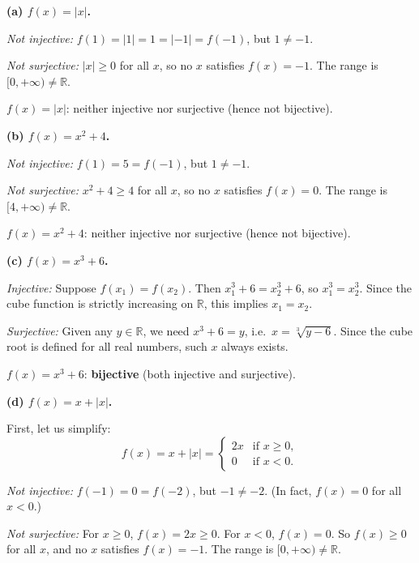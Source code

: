 \documentclass[12pt, a4paper]{article}
\newcommand{\R}{\mathbb{R}}
\begin{document}
\medskip

\textbf{(a)\; $f(x) = |x|$.}

\emph{Not injective:}\; $f(1) = |1| = 1 = |-1| = f(-1)$, but $1 \neq -1$.

\emph{Not surjective:}\; $|x| \ge 0$ for all $x$, so no $x$ satisfies $f(x) = -1$.
The range is $[0, +\infty) \neq \R$.

\begin{answerbox}
$f(x) = |x|$: neither injective nor surjective (hence not bijective).
\end{answerbox}

\bigskip
\textbf{(b)\; $f(x) = x^2 + 4$.}

\emph{Not injective:}\; $f(1) = 5 = f(-1)$, but $1 \neq -1$.

\emph{Not surjective:}\; $x^2 + 4 \ge 4$ for all $x$, so no $x$ satisfies $f(x) = 0$.
The range is $[4, +\infty) \neq \R$.

\begin{answerbox}
$f(x) = x^2 + 4$: neither injective nor surjective (hence not bijective).
\end{answerbox}

\bigskip
\textbf{(c)\; $f(x) = x^3 + 6$.}

\emph{Injective:}\; Suppose $f(x_1) = f(x_2)$. Then $x_1^3 + 6 = x_2^3 + 6$,
so $x_1^3 = x_2^3$. Since the cube function is strictly increasing on $\R$,
this implies $x_1 = x_2$.

\emph{Surjective:}\; Given any $y \in \R$, we need $x^3 + 6 = y$, i.e.\
$x = \sqrt[3]{y - 6}$. Since the cube root is defined for all real numbers,
such $x$ always exists.

\begin{answerbox}
$f(x) = x^3 + 6$: \textbf{bijective} (both injective and surjective).
\end{answerbox}

\bigskip
\textbf{(d)\; $f(x) = x + |x|$.}

First, let us simplify:
\[
  f(x) = x + |x| = \begin{cases} 2x & \text{if } x \ge 0, \\ 0 & \text{if } x < 0. \end{cases}
\]

\emph{Not injective:}\; $f(-1) = 0 = f(-2)$, but $-1 \neq -2$.
(In fact, $f(x) = 0$ for all $x < 0$.)

\emph{Not surjective:}\; For $x \ge 0$, $f(x) = 2x \ge 0$.
For $x < 0$, $f(x) = 0$. So $f(x) \ge 0$ for all $x$,
and no $x$ satisfies $f(x) = -1$. The range is $[0, +\infty) \neq \R$.
\end{document}
